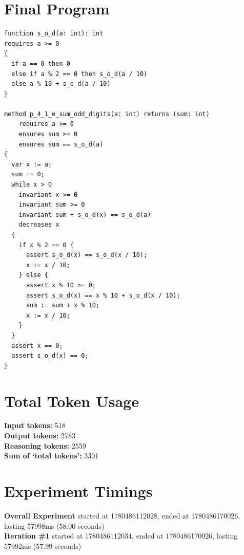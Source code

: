 \documentclass{article}
\begin{document}
\section*{Final Program}
\begin{lstlisting}
function s_o_d(a: int): int
requires a >= 0
{
  if a == 0 then 0
  else if a % 2 == 0 then s_o_d(a / 10)
  else a % 10 + s_o_d(a / 10)
}

method p_4_1_e_sum_odd_digits(a: int) returns (sum: int)
	requires a >= 0
	ensures sum >= 0
	ensures sum == s_o_d(a)
{
  var x := a;
  sum := 0;
  while x > 0
    invariant x >= 0
    invariant sum >= 0
    invariant sum + s_o_d(x) == s_o_d(a)
    decreases x
  {
    if x % 2 == 0 {
      assert s_o_d(x) == s_o_d(x / 10);
      x := x / 10;
    } else {
      assert x % 10 >= 0;
      assert s_o_d(x) == x % 10 + s_o_d(x / 10);
      sum := sum + x % 10;
      x := x / 10;
    }
  }
  assert x == 0;
  assert s_o_d(x) == 0;
}
\end{lstlisting}
\section*{Total Token Usage}
\textbf{Input tokens: }518
\\\textbf{Output tokens: }2783
\\\textbf{Reasoning tokens: }2559
\\\textbf{Sum of `total tokens': }3301
\section*{Experiment Timings}
\textbf{Overall Experiment} started at 1780486112028, ended at 1780486170026, lasting 57998ms (58.00 seconds)
\\\textbf{Iteration \#1} started at 1780486112034, ended at 1780486170026, lasting 57992ms (57.99 seconds)
\end{document}
